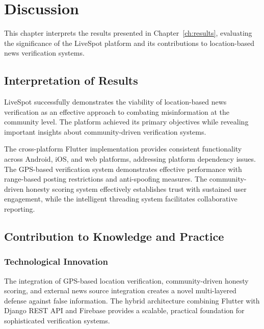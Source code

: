 \chapter{Discussion}
\label{ch:discussion}

This chapter interprets the results presented in Chapter~\ref{ch:results}, evaluating the significance of the LiveSpot platform and its contributions to location-based news verification systems.

\section{Interpretation of Results}
\label{sec:interpretation}

LiveSpot successfully demonstrates the viability of location-based news verification as an effective approach to combating misinformation at the community level. The platform achieved its primary objectives while revealing important insights about community-driven verification systems.

The cross-platform Flutter implementation provides consistent functionality across Android, iOS, and web platforms, addressing platform dependency issues. The GPS-based verification system demonstrates effective performance with range-based posting restrictions and anti-spoofing measures. The community-driven honesty scoring system effectively establishes trust with sustained user engagement, while the intelligent threading system facilitates collaborative reporting.

\section{Contribution to Knowledge and Practice}
\label{sec:contribution}

\subsection{Technological Innovation}
\label{subsec:technological_innovation}

The integration of GPS-based location verification, community-driven honesty scoring, and external news source integration creates a novel multi-layered defense against false information. The hybrid architecture combining Flutter with Django REST API and Firebase provides a scalable, practical foundation for sophisticated verification systems.


